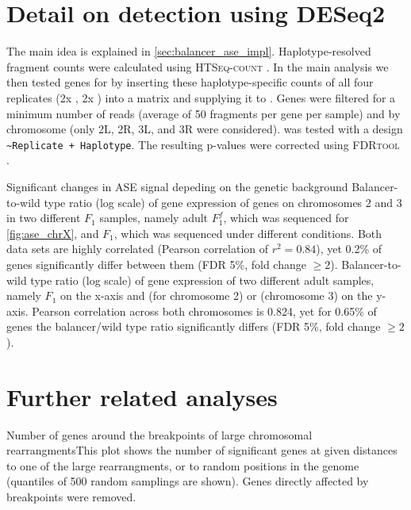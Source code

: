 \section{Detail on \texorpdfstring{\ase}{ASE} detection using DESeq2}
\label{sec:suppl_deseq}
The main idea is explained in \cref{sec:balancer_ase_impl}. Haplotype-resolved
fragment counts were calculated using \textsc{HTSeq-count} \citep{Anders2015}.
In the main analysis we then tested genes for \ase by inserting these
haplotype-specific counts of all four replicates (2x \Nmat, 2x \Npat) into a
matrix and supplying it to \deseq. Genes were filtered for a minimum number of
reads (average of 50 fragments per gene per sample) and by chromosome (only 2L,
2R, 3L, and 3R were considered). \deseq was tested with a design
\texttt{\footnotesize \textasciitilde Replicate + Haplotype}. The resulting
p-values were corrected using \textsc{FDRtool} \citep{Strimmer2008}.



    {Significant changes in ASE signal depeding on the genetic background}{
     Balancer-to-wild type ratio (log scale) of gene
    expression of genes on chromosomes 2 and 3 in two different $F_1$ samples,
    namely adult $F_1^f$, which was sequenced for \cref{fig:ase_chrX}, and $F_1$,
    which was sequenced under different conditions. Both data sets are highly
    correlated (Pearson correlation of $r^2 = 0.84$), yet 0.2\% of genes significantly differ
    between them (FDR 5\%, fold change $\geq 2$).
     Balancer-to-wild type ratio (log scale) of gene expression
    of two different adult samples, namely $F_1$ on the x-axis and \Fcyo (for
    chromosome 2) or \Ftm (chromosome 3) on the y-axis. Pearson correlation
    across both chromosomes is 0.824, yet for 0.65\% of genes the balancer/wild
    type ratio significantly differs (FDR 5\%, fold change $\geq 2$).}


\section{Further \texorpdfstring{\ase}{ASE} related analyses}
\label{sec:suppl_ase_more}

    {Number of \texorpdfstring{\ase}{ASE} genes around the breakpoints of large
    chromosomal rearrangments}{This plot shows the number of significant \ase
    genes at given distances to one of the large rearrangments, or to random
    positions in the genome (quantiles of 500 random samplings are shown).
    Genes directly affected by breakpoints were removed.}






